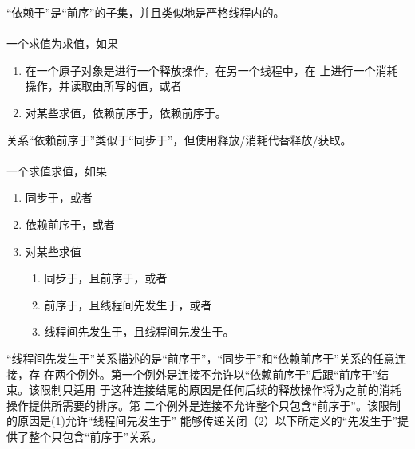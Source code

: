 \begin{note}
  “依赖于”是“前序”的子集，并且类似地是严格线程内的。
\end{note}

\paragraph{} %
一个求值为求值，如果
\begin{enumerate}
  \item {}在一个原子对象是进行一个释放操作，在另一个线程中，在
        上进行一个消耗操作，并读取由所写的值，或者
  \item 对某些求值，依赖前序于，依赖前序于。
\end{enumerate}

\begin{note}
  关系“依赖前序于”类似于“同步于”，但使用释放/消耗代替释放/获取。
\end{note}

\paragraph{} %
一个求值求值，如果
\begin{enumerate}
  \item {}同步于，或者
  \item {}依赖前序于，或者
  \item 对某些求值
        \begin{enumerate}
          \item {}同步于，且前序于，或者
          \item {}前序于，且线程间先发生于，或者
          \item {}线程间先发生于，且线程间先发生于。
        \end{enumerate}
\end{enumerate}

\begin{note}
  “线程间先发生于”关系描述的是“前序于”，“同步于”和“依赖前序于”关系的任意连接，存
  在两个例外。第一个例外是连接不允许以“依赖前序于”后跟“前序于”结束。该限制只适用
  于这种连接结尾的原因是任何后续的释放操作将为之前的消耗操作提供所需要的排序。第
  二个例外是连接不允许整个只包含“前序于”。该限制的原因是(1)允许“线程间先发生于”
  能够传递关闭（2）以下所定义的“先发生于”提供了整个只包含“前序于”关系。
\end{note}

